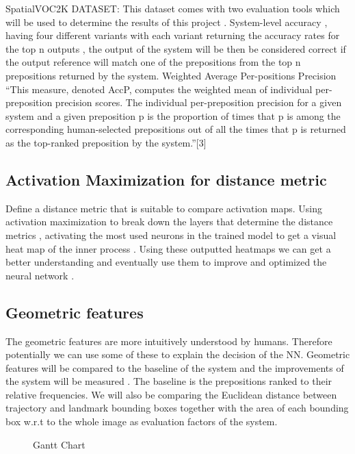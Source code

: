 \documentclass{csfyp}
\begin{document}
SpatialVOC2K DATASET:
This dataset comes with two evaluation tools which will be used to determine the results of this project . 
System-level accuracy , having four different variants with each variant returning the accuracy rates for the top n outputs , the output of the system will be then be considered correct if the output reference will match one of the prepositions from the top n prepositions returned by the system.
Weighted Average Per-positions Precision “This measure, denoted AccP, computes the weighted mean of individual per-preposition precision scores. The individual per-preposition precision for a given system and a given preposition p is the proportion of times that p is among the corresponding human-selected prepositions out of all the times that p is returned as the top-ranked preposition by the system.”[3]

\subsection{Activation Maximization for distance metric}
Define a distance metric that is suitable to compare activation maps. Using activation maximization to break down the layers that determine the distance metrics , activating the most used neurons in the trained model to get a visual heat map of the inner process . Using these outputted heatmaps we can get a better understanding and eventually use them to improve and optimized the neural network .

\subsection{Geometric features}
The geometric features are more intuitively understood by humans. Therefore potentially we can use some of these to explain the decision of the NN. 
Geometric features will be compared to the baseline of the system and the improvements of the system will be measured . The baseline is the prepositions ranked to their relative frequencies. We will also be comparing the Euclidean distance between trajectory and landmark bounding boxes together with the area of each bounding box w.r.t to the whole image as evaluation factors of the system.

\begin{figure}
\begin{center}
  \centerline{}
\end{center}
\caption{Gantt Chart} \label{f:pic}
\end{figure}
\end{document}

